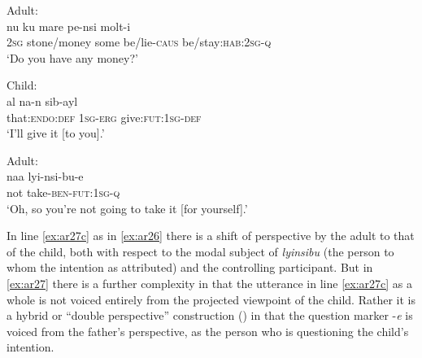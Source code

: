 \documentclass[output=paper]{langsci/langscibook}
\begin{document}
\begin{exe}
	\ex \label{ex:ar27}
	\begin{xlist}
	\ex Adult:\label{ex:ar27a}\\
	\gll nu ku mare pe-nsi molt-i\\
	2\textsc{sg} stone/money some be/lie-\textsc{caus} be/stay:\textsc{hab}:2\textsc{sg}-\textsc{q}\\
	\trans ‘Do you have any money?’	
	
	\ex Child:\label{ex:ar27b}\\
	\gll al na-n sib-ayl\\
	that:\textsc{endo}:\textsc{def}	1\textsc{sg}-\textsc{erg}			give:\textsc{fut}:1\textsc{sg}-\textsc{def}\\
	\trans ‘I’ll give it [to you].’
	
	\ex Adult:\label{ex:ar27c}\\
	\gll naa	 lyi-nsi-bu-e\\
	not take-\textsc{ben}-\textsc{fut}:1\textsc{sg}-\textsc{q}\\
	\trans ‘Oh, so you’re not going to take it [for yourself].’
	\end{xlist}
\end{exe}

In line \ref{ex:ar27c} as in \ref{ex:ar26} there is a shift of perspective by the adult to that of the child, both with respect to the modal subject of \textit{lyinsibu} (the person to whom the intention as attributed) and the controlling participant. But in \ref{ex:ar27} there is a further complexity in that the utterance in line \ref{ex:ar27c} as a whole is not voiced entirely from the projected viewpoint of the child. Rather it is a hybrid or “double perspective” construction (\citealt{Evans2006a}) in that the question marker -\textit{e} is voiced from the father’s perspective, as the person who is questioning the child’s intention.
\end{document}
